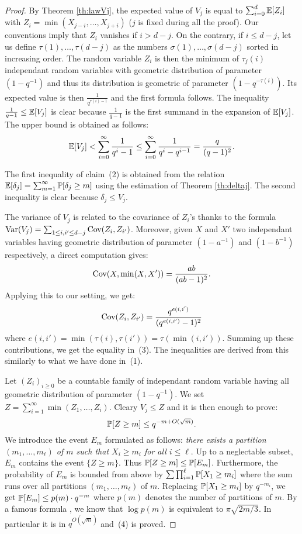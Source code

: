\documentclass{sig-alternate}
\begin{document}
\begin{proof}
By Theorem \ref{th:lawVj}, the expected value of $V_j$ is equal to 
$\sum_{i=0}^d \E[Z_i]$ with $Z_i = \min(X_{j-i}, \ldots, X_{j+i})$ ($j$ 
is fixed during all the proof). Our conventions imply that $Z_i$ 
vanishes if $i > d-j$. On the contrary, if $i \leq d-j$, let us define 
$\tau(1), \ldots, \tau(d-j)$ as the numbers $\sigma(1), \ldots, 
\sigma(d-j)$ sorted in increasing order. The random variable $Z_i$ 
is then the minimum of $\tau_j(i)$ independant random variables with 
geometric distribution of parameter $(1 - q^{-1})$ and thus its 
distribution is geometric of parameter $(1 - q^{-\tau(i)})$.
Its expected value is then $\frac 1 {q^{\tau(i) - 1}}$ and the first
formula follows. The inequality $\frac 1 {q-1} \leq \E[V_j]$ is clear
because $\frac 1 {q-1}$ is the first summand in the expansion of
$\E[V_j]$. The upper bound is obtained as follows:
$$\E[V_j] < \sum_{i=0}^\infty \frac 1{q^i - 1}
\leq \sum_{i=0}^\infty \frac 1{q^i - q^{i-1}} = \frac q {(q-1)^2}.$$

The first inequality of claim~(2) is obtained from the relation 
$\E[\delta_j] = \sum_{m=1}^\infty \P[\delta_j \geq m]$ using the 
estimation of Theorem \ref{th:deltaj}. The second inequality is 
clear because $\delta_j \leq V_j$.

The variance of $V_j$ is related to the covariance of $Z_i$'s thanks to 
the formula
$\Var(V_j) = \sum_{1 \leq i,i' \leq d-j} \Cov(Z_i, Z_{i'})$.
Moreover, given $X$ and $X'$ two independant variables having geometric
distribution of parameter $(1 - a^{-1})$ and $(1 - b^{-1})$ respectively,
a direct computation gives:
$$\Cov(X, \min(X,X')) = \frac{ab}{(ab-1)^2}.$$
Applying this to our setting, we get:
$$\Cov(Z_i, Z_{i'}) = \frac{q^{e(i,i')}}{(q^{e(i,i')}-1)^2}$$
where $e(i,i') = \min(\tau(i), \tau(i')) = \tau(\min(i,i'))$. Summing
up these contributions, we get the equality in~(3). The inequalities
are derived from this similarly to what we have done in~(1).

Let $(Z_i)_{i \geq 0}$ be a countable family 
of independant random variable having all geometric distribution of 
parameter $(1 - q^{-1})$. We set $Z = \sum_{i=1}^\infty \min(Z_1, \ldots, 
Z_i)$. Cleary $V_j \leq Z$ and it is then enough to prove:
$$\P[Z \geq m] \leq q^{-m + O(\sqrt m)}.$$
We introduce the event $E_m$ formulated as follows:
\emph{there exists a partition $(m_1, \ldots, m_\ell)$ of $m$ such that $X_i 
\geq m_i$ for all $i \leq \ell$}.
Up to a neglectable subset, $E_m$ contains the event $\{ Z \geq m\}$.
Thus $\P[Z \geq m] \leq \P[E_m]$. Furthermore, the probability of $E_m$
is bounded from above by $\sum \prod_{i=1}^\ell \P[X_1 \geq m_i]$ where
the sum runs over all partitions $(m_1, \ldots, m_\ell)$ of $m$. 
Replacing $\P[X_1 \geq m_i]$ by $q^{-m_i}$, we get
$\P[E_m] \leq p(m) \cdot q^{-m}$
where $p(m)$ denotes the number of partitions of $m$. By a famous 
formula \cite{andrews}, we know that $\log p(m)$ is equivalent to $\pi 
\sqrt{2m/3}$. In particular it is in $q^{O(\sqrt m)}$ and~(4) is proved.


\end{proof}
\end{document}
